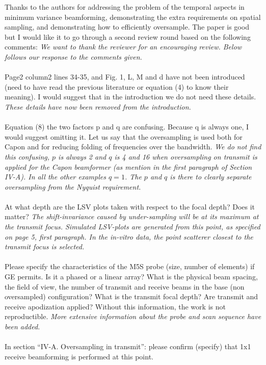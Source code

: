 \documentclass{article}
\begin{document}
Thanks to the authors for addressing the problem of the temporal aspects in minimum variance beamforming, demonstrating the extra requirements on spatial sampling, and demonstrating how to efficiently oversample. The paper is good but I would like it to go through a second review round based on the following comments:
\textit{We want to thank the reviewer for an encouraging review. Below follows our response to the comments given.}
\\\\
Page2 column2 lines 34-35, and Fig. 1, L, M and d have not been introduced (need to have read the previous literature or equation (4) to know their meaning). I would suggest that in the introduction we do not need these details.
\textit{These details have now been removed from the introduction.}
\\\\
Equation (8) the two factors p and q are confusing. Because q is always one, I would suggest omitting it.  Let us say that the oversampling is used both for Capon and for reducing folding of frequencies over the bandwidth.
\textit{We do not find this confusing, $p$ is always 2 and $q$ is 4 and 16 when oversampling on transmit is applied for the Capon beamformer (as mention in the first paragraph of Section IV-A). In all the other examples $q=1$. The $p$ and $q$ is there to clearly separate oversampling from the Nyquist requirement.}
\\\\
At what depth are the LSV plots taken with respect to the focal depth? Does it matter?
\textit{The shift-invariance caused by under-sampling will be at its maximum at the transmit focus. Simulated LSV-plots are generated from this point, as specified on page 5, first paragraph. In the in-vitro data, the point scatterer closest to the transmit focus is selected.}
\\\\
Please specify the characteristics of the M5S probe (size, number of elements) if GE permits. Is it a phased or a linear array? What is the physical beam spacing, the field of view, the number of transmit and receive beams in the base (non oversampled) configuration? What is the transmit focal depth? Are transmit and receive apodization applied? Without this information, the work is not reproductible.
\textit{More extensive information about the probe and scan sequence have been added.}
\\\\
In section “IV-A. Oversampling in transmit”: please confirm (specify) that 1x1 receive beamforming is performed at this point.
\end{document}
